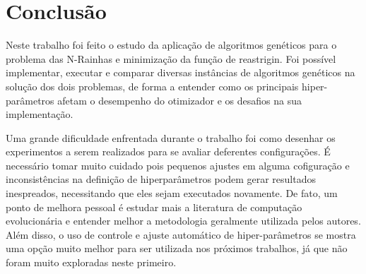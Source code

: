 \documentclass[conference]{IEEEtran}
\begin{document}




\section{Conclusão}
Neste trabalho foi feito o estudo da aplicação de algoritmos genéticos para o problema das N-Rainhas e minimização da função de reastrigin. Foi possível implementar, executar e comparar diversas instâncias de algoritmos genéticos na solução dos dois problemas, de forma a entender como os principais hiper-parâmetros afetam o desempenho do otimizador e os desafios na sua implementação.

Uma grande dificuldade enfrentada durante o trabalho foi como desenhar os experimentos a serem realizados para se avaliar deferentes configurações. É necessário tomar muito cuidado pois pequenos ajustes em alguma cofiguração e inconsistências na definição de hiperparâmetros podem gerar resultados inespreados, necessitando que eles sejam executados novamente. De fato, um ponto de melhora pessoal é estudar mais a literatura de computação evolucionária e entender melhor a metodologia geralmente utilizada pelos autores. Além disso, o uso de controle e ajuste automático de hiper-parâmetros se mostra uma opção muito melhor para ser utilizada nos próximos trabalhos, já que não foram muito exploradas neste primeiro.





\end{document}
